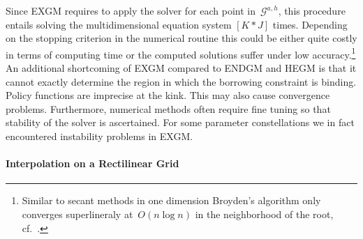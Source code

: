 \documentclass[a4paper,12pt]{article}%
\begin{document}
Since EXGM requires to apply the solver for each point in~$\mathcal{G}^{a,h}$, this procedure entails solving the multidimensional equation system $\left[ K \ast J\right]$ times. Depending on the stopping criterion in the numerical routine this could be either quite costly in terms of computing time or the computed solutions suffer under low accuracy.\footnote{Similar to secant methods in one dimension Broyden's algorithm only converges superlineraly at~$O(n\log n)$ in the neighborhood of the root, cf.~.}
An additional shortcoming of EXGM compared to ENDGM and HEGM is that it cannot exactly determine the region in which the borrowing constraint is binding. Policy functions are imprecise at the kink. This may also cause convergence problems. Furthermore, numerical methods often require fine tuning so that stability of the solver is ascertained. For some parameter constellations we in fact encountered instability problems in EXGM.

\paragraph{Interpolation on a Rectilinear Grid}
\end{document}
